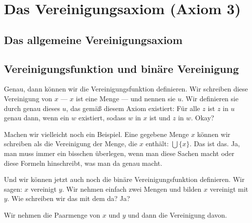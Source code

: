\section{Das Vereinigungsaxiom (Axiom 3)}

\subsection{Das allgemeine Vereinigungsaxiom}

\begin{math-stroke}
\begin{axioms}
\end{axioms}
\end{math-stroke}

\subsection{Vereinigungsfunktion und binäre Vereinigung}
\begin{spoken-clean}[00:15:06 - 00:17:17]
Genau, dann können wir die Vereinigungsfunktion definieren. Wir schreiben diese Vereinigung von $x$ --- $x$ ist eine Menge --- und nennen sie $u$. Wir definieren sie durch genau dieses $u$, das gemäß diesem Axiom existiert: Für alle $z$ ist $z$ in $u$ genau dann, wenn ein $w$ existiert, sodass $w$ in $x$ ist und $z$ in $w$. Okay?

Machen wir vielleicht noch ein Beispiel. Eine gegebene Menge $x$ können wir schreiben als die Vereinigung der Menge, die $x$ enthält: $\bigcup \{x\}$. Das ist das. Ja, man muss immer ein bisschen überlegen, wenn man diese Sachen macht oder diese Formeln hinschreibt, was man da genau macht.

Und wir können jetzt auch noch die binäre Vereinigungsfunktion definieren. Wir sagen: $x$ vereinigt $y$. Wir nehmen einfach zwei Mengen und bilden $x$ vereinigt mit $y$. Wie schreiben wir das mit dem da? Ja?
\end{spoken-clean}

\begin{student-interaction}[Studentenantwort]
Wir nehmen die Paarmenge von $x$ und $y$ und dann die Vereinigung davon.
\end{student-interaction}

